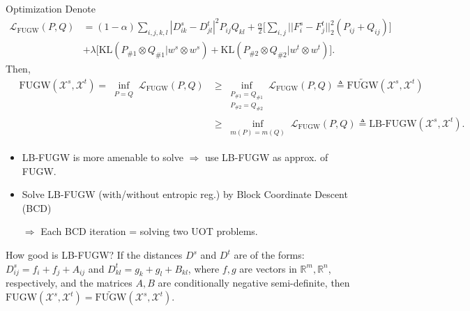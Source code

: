 \documentclass{beamer}
\newcommand{\fugw}{\text{FUGW}}
\newcommand{\kl}{\text{KL}}
\newcommand{\cX}{\mathcal X}
\newcommand{\cL}{\mathcal L}
\newcommand{\bbR}{\mathbb R}
\begin{document}
\begin{frame}{Optimization}
\scriptsize
Denote
\vspace{-0.3cm}
\begin{align*}
  \cL_{\fugw}(P, Q) &=
  (1 - \alpha) \sum_{i,j,k,l} | D^s_{ik} - D^t_{jl}|^2 P_{ij} Q_{kl}
  + \frac{\alpha}{2} \Big[ \sum_{i,j} || F^s_i - F^t_j||_2^2 (P_{ij} + Q_{ij}) \Big] \\
  &+ \lambda \Big[ \kl(P_{\# 1} \otimes Q_{\# 1} \vert w^s \otimes w^s)
  + \kl(P_{\# 2} \otimes Q_{\# 2} \vert w^t \otimes w^t) \Big].
\end{align*}
\vspace{-0.3cm}
Then,
\begin{align*}
  \quad \fugw(\cX^s, \cX^t) = \inf_{\substack{P = Q}}
  \cL_{\fugw}(P, Q) &\geq \inf_{\substack{P_{\#1} = Q_{\#1} \\ P_{\#2} = Q_{\#2}}}
  \cL_{\fugw}(P, Q) \triangleq \widetilde{\fugw}(\cX^s, \cX^t) \\
  &\geq \inf_{\substack{m(P) = m(Q)}}
  \cL_{\fugw}(P, Q) \triangleq \text{LB-FUGW} (\cX^s, \cX^t).
\end{align*}
\vspace{-0.3cm}
\begin{itemize}
  \item LB-FUGW is more amenable to solve
  $\Rightarrow$ use LB-FUGW as approx. of FUGW.
  \item Solve LB-FUGW (with/without entropic reg.)
  by Block Coordinate Descent (BCD)

  $\Rightarrow$ Each BCD iteration = solving two UOT problems.
\end{itemize}

\begin{block}{How good is LB-FUGW?}
  If the distances $D^s$ and $D^t$ are of the forms: $D^s_{ij} = f_i + f_j + A_{ij}$ and
  $D^t_{kl} = g_k + g_l + B_{kl}$, where $f, g$ are vectors in $\bbR^m, \bbR^n$, respectively,
  and the matrices $A, B$ are conditionally negative semi-definite, then
  $\fugw (\cX^s, \cX^t) = \widetilde{\fugw}(\cX^s, \cX^t)$.
\end{block}

\end{frame}
\end{document}
